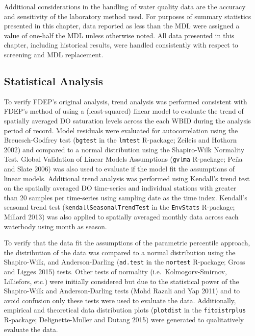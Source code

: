 \documentclass[]{interact}
\theoremstyle{plain}%
\theoremstyle{definition}
\theoremstyle{remark}
\begin{document}
Additional considerations in the handling of water quality data are the
accuracy and sensitivity of the laboratory method used. For purposes of
summary statistics presented in this chapter, data reported as less than
the MDL were assigned a value of one-half the MDL unless otherwise
noted. All data presented in this chapter, including historical results,
were handled consistently with respect to screening and MDL replacement.

\hypertarget{statistical-analysis}{%
\subsection{Statistical Analysis}\label{statistical-analysis}}

To verify FDEP's original analysis, trend analysis was performed
consistent with FDEP's method of using a (least-squared) linear model to
evaluate the trend of spatially averaged DO saturation levels across the
each WBID during the analysis period of record. Model residuals were
evaluated for autocorrelation using the Breucsch-Godfrey test
(\texttt{bgtest} in the \texttt{lmtest} R-package; Zeileis and Hothorn
2002) and compared to a normal distribution using the Shapiro-Wilk
Normality Test. Global Validation of Linear Models Assumptions
(\texttt{gvlma} R-package; Peña and Slate 2006) was also used to
evaluate if the model fit the assumptions of linear models. Additional
trend analysis was performed using Kendall's trend test on the spatially
averaged DO time-series and individual stations with greater than 20
samples per time-series using sampling date as the time index. Kendall's
seasonal trend test (\texttt{kendallSeasonalTrendTest} in the
\texttt{EnvStats} R-package; Millard 2013) was also applied to spatially
averaged monthly data across each waterbody using month as season.

To verify that the data fit the assumptions of the parametric percentile
approach, the distribution of the data was compared to a normal
distribution using the Shapiro-Wilk, and Anderson-Darling
(\texttt{ad.test} in the \texttt{nortest} R-package; Gross and Ligges
2015) tests. Other tests of normality (i.e.~Kolmogorv-Smirnov,
Lilliefors, etc.) were initially considered but due to the statistical
power of the Shapiro-Wilk and Anderson-Darling tests (Mohd Razali and
Yap 2011) and to avoid confusion only these tests were used to evaluate
the data. Additionally, empirical and theoretical data distribution
plots (\texttt{plotdist} in the \texttt{fitdistrplus} R-package;
Delignette-Muller and Dutang 2015) were generated to qualitatively
evaluate the data.
\end{document}
